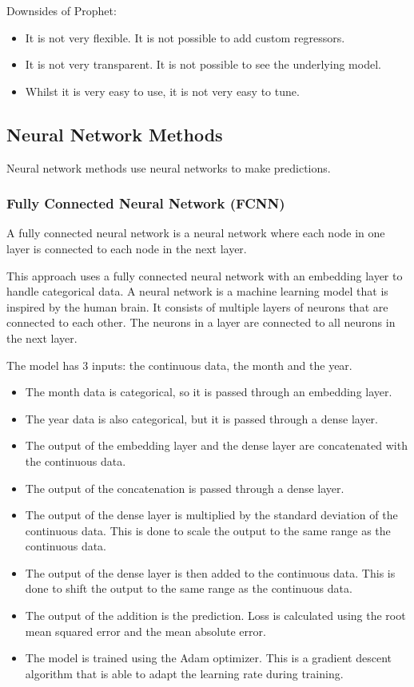 \documentclass[manuscript,screen,nonacm,11pt]{acmart}
\numberwithin{equation}{section}
\begin{document}
Downsides of Prophet:
\begin{itemize}
	\item It is not very flexible. It is not possible to add custom regressors.
	\item It is not very transparent. It is not possible to see the underlying model.
	\item Whilst it is very easy to use, it is not very easy to tune.
\end{itemize}

\subsection{Neural Network Methods}
Neural network methods use neural networks to make predictions.
\subsubsection{Fully Connected Neural Network (FCNN)}
A fully connected neural network is a neural network where each node in one
    layer is connected to each node in the next layer.

	This approach uses a fully connected neural network with an embedding layer 
	to handle categorical data.
	A neural network is a machine learning model that is inspired by the human brain.
	It consists of multiple layers of neurons that are connected to each other.
	The neurons in a layer are connected to all neurons in the next layer.
	
	The model has 3 inputs: the continuous data, the month and the year.
	\begin{itemize}
		\item The month data is categorical, so it is passed through an embedding layer.
		\item The year data is also categorical, but it is passed through a dense layer.
		\item The output of the embedding layer and the dense layer are concatenated with the continuous data.
		\item The output of the concatenation is passed through a dense layer.
		\item The output of the dense layer is multiplied by the standard deviation of the continuous data. 
		This is done to scale the output to the same range as the continuous data.
		\item The output of the dense layer is then added to the continuous data. This is done to shift 
		the output to the same range as the continuous data.
		\item The output of the addition is the prediction.
		Loss is calculated using the root mean squared error and the mean absolute error.
		\item The model is trained using the Adam optimizer. This is a gradient descent algorithm that
		is able to adapt the learning rate during training.
	\end{itemize}
\end{document}
